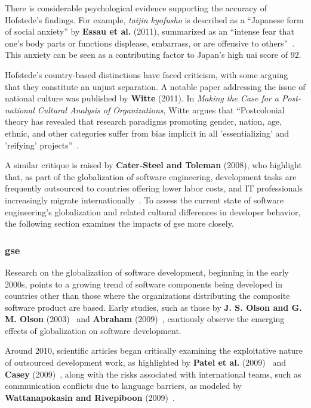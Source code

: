 There is considerable psychological evidence supporting the accuracy of Hofstede's findings.
For example, \textit{taijin kyofusho} is described as a ``Japanese form of social anxiety'' by \textbf{Essau et al.} (2011), summarized as an ``intense fear that one's body parts or functions displease, embarrass, or are offensive to others''~\cite{Essau2011}.
This anxiety can be seen as a contributing factor to Japan's high \ac{uai} score of 92.

Hofstede's country-based distinctions have faced criticism, with some arguing that they constitute an unjust separation.
A notable paper addressing the issue of national culture was published by \textbf{Witte} (2011).
In \textit{Making the Case for a Post-national Cultural Analysis of Organizations}, Witte argues that ``Postcolonial theory has revealed that research paradigms promoting gender, nation, age, ethnic, and other categories suffer from bias implicit in all 'essentializing' and 'reifying' projects''~\cite{Witte2011}.

A similar critique is raised by \textbf{Cater-Steel and Toleman} (2008), who highlight that, as part of the globalization of software engineering, development tasks are frequently outsourced to countries offering lower labor costs, and IT professionals increasingly migrate internationally~\cite{Steel2008}.
To assess the current state of software engineering's globalization and related cultural differences in developer behavior, the following section examines the impacts of \ac{gse} more closely.


\subsubsection{\acl{gse}}
\label{sec:related-work-culture-gse}

Research on the globalization of software development, beginning in the early 2000s, points to a growing trend of software components being developed in countries other than those where the organizations distributing the composite software product are based.
Early studies, such as those by \textbf{J. S. Olson and G. M. Olson} (2003)~\cite{Olson2003} and \textbf{Abraham} (2009)~\cite{Abraham2009}, cautiously observe the emerging effects of globalization on software development.

Around 2010, scientific articles began critically examining the exploitative nature of outsourced development work, as highlighted by \textbf{Patel et al.} (2009)~\cite{Patel2009} and \textbf{Casey} (2009)~\cite{Casey2009}, along with the risks associated with international teams, such as communication conflicts due to language barriers, as modeled by \textbf{Wattanapokasin and Rivepiboon} (2009)~\cite{Wattanapokasin2009}.


